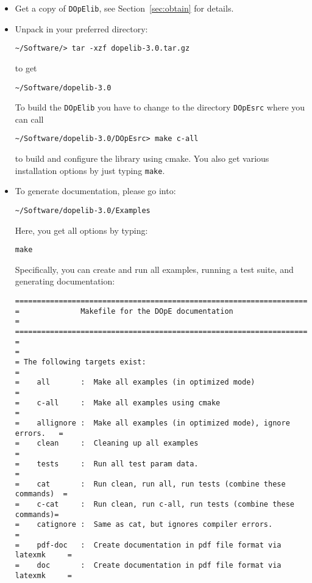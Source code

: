 \begin{itemize}
%
\item Get a copy of \texttt{DOpElib}, see Section~\ref{sec:obtain} for details.
%
\item Unpack in your preferred directory:
\begin{lstlisting}
~/Software/> tar -xzf dopelib-3.0.tar.gz
\end{lstlisting}
to get
\begin{lstlisting}
~/Software/dopelib-3.0
\end{lstlisting}
To build the \texttt{DOpElib} you have to change to the directory 
\texttt{DOpEsrc} where you can call 
\begin{lstlisting}
~/Software/dopelib-3.0/DOpEsrc> make c-all
\end{lstlisting}
to build and configure the library using cmake. 
You also get various installation options by just typing 
\texttt{make}.
\item To generate documentation, please go into:
\begin{lstlisting}
~/Software/dopelib-3.0/Examples
\end{lstlisting}
Here, you get all options by typing:
\begin{lstlisting}
make
\end{lstlisting}
Specifically, you can create and run all examples, running a test suite,
and generating documentation:
{\footnotesize
\begin{lstlisting}
===========================================================================
=              Makefile for the DOpE documentation                        =
===========================================================================
=                                                                         =
= The following targets exist:                                            =
=    all       :  Make all examples (in optimized mode)                   =
=    c-all     :  Make all examples using cmake                           =
=    allignore :  Make all examples (in optimized mode), ignore errors.   =
=    clean     :  Cleaning up all examples                                =
=    tests     :  Run all test param data.                                =
=    cat       :  Run clean, run all, run tests (combine these commands)  =
=    c-cat     :  Run clean, run c-all, run tests (combine these commands)=
=    catignore :  Same as cat, but ignores compiler errors.               =
=    pdf-doc   :  Create documentation in pdf file format via latexmk     =
=    doc       :  Create documentation in pdf file format via latexmk     =

\end{lstlisting}}
\end{itemize}

